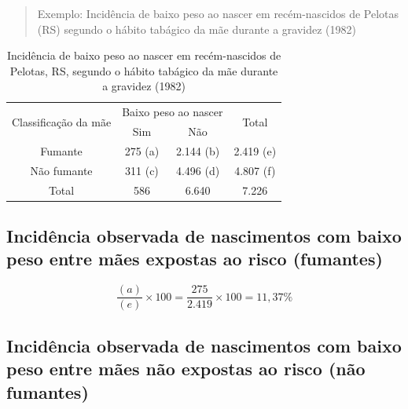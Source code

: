 \documentclass[
]{book}
\begin{document}
\hfill\break

\hfill\break

\begin{quote}
Exemplo: Incidência de baixo peso ao nascer em recém-nascidos de Pelotas (RS) segundo o hábito tabágico da mãe durante a gravidez (1982)
\end{quote}

\hfill\break

\begin{table}
\centering
\caption{Incidência de baixo peso ao nascer em recém-nascidos de Pelotas, RS,
segundo o hábito tabágico da mãe durante a gravidez (1982)}
\begin{tabular}{c|c|c|c}
\hline
\multirow{2}{*}{Classificação da mãe} & \multicolumn{2}{c|}{Baixo peso ao nascer} & \multirow{2}{*}{Total}  \\ \cline{2-3}
             & Sim & Não &        \\ 
\hline              
Fumante & 275 (a) & 2.144 (b) & 2.419 (e)   \\
\hline 
Não fumante & 311 (c) & 4.496 (d) & 4.807 (f)  \\
\hline 
Total & 586 & 6.640 & 7.226  \\
\hline 
\end{tabular}
\label{tab33}
\end{table} 

\hfill\break

\hypertarget{inciduxeancia-observada-de-nascimentos-com-baixo-peso-entre-muxe3es-expostas-ao-risco-fumantes}{%
\subsection{Incidência observada de nascimentos com baixo peso entre mães expostas ao risco (fumantes)}\label{inciduxeancia-observada-de-nascimentos-com-baixo-peso-entre-muxe3es-expostas-ao-risco-fumantes}}

\hfill\break

\[
\frac{(a)}{(e)} \times 100  = \frac{275}{2.419} \times 100 = 11,37 \%
\]

\hfill\break

\hypertarget{inciduxeancia-observada-de-nascimentos-com-baixo-peso-entre-muxe3es-nuxe3o-expostas-ao-risco-nuxe3o-fumantes}{%
\subsection{Incidência observada de nascimentos com baixo peso entre mães não expostas ao risco (não fumantes)}\label{inciduxeancia-observada-de-nascimentos-com-baixo-peso-entre-muxe3es-nuxe3o-expostas-ao-risco-nuxe3o-fumantes}}
\end{document}

